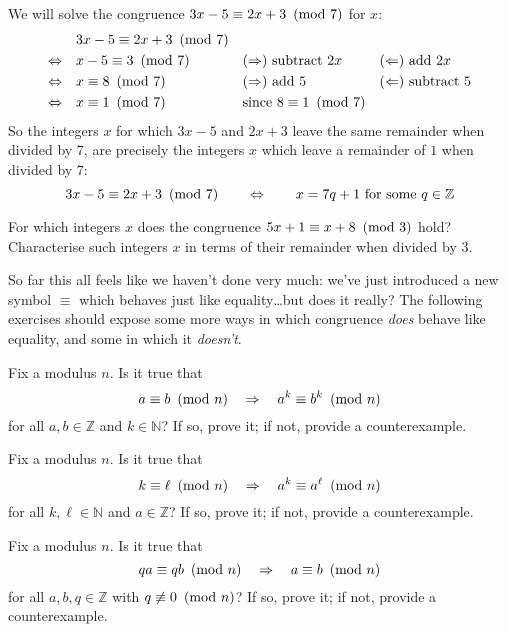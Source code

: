 \begin{example}
We will solve the congruence $3x-5 \equiv 2x+3 ~\left(\text{mod}~7\right)$ for $x$:
\begin{align*}
& 3x-5 \equiv 2x+3 ~\left(\text{mod}~7\right) && && \\
\Leftrightarrow\quad & x-5 \equiv 3 ~\left(\text{mod}~7\right) && \text{$(\Rightarrow)$ subtract $2x$} && \text{$(\Leftarrow)$ add $2x$} \\
\Leftrightarrow\quad & x \equiv 8 ~\left(\text{mod}~7\right) && \text{($\Rightarrow$) add $5$} && \text{($\Leftarrow$) subtract $5$} \\
\Leftrightarrow\quad & x \equiv 1 ~\left(\text{mod}~7\right) && \text{since $8 \equiv 1 ~\left(\text{mod}~7\right)$} &&
\end{align*}
So the integers $x$ for which $3x-5$ and $2x+3$ leave the same remainder when divided by $7$, are precisely the integers $x$ which leave a remainder of $1$ when divided by $7$:
\[ 3x-5 \equiv 2x+3 ~\left(\text{mod}~7\right) \qquad \Leftrightarrow \qquad x = 7q+1 \text{ for some } q \in \mathbb{Z} \]
\end{example}

\begin{exercise}
For which integers $x$ does the congruence $5x+1 \equiv x+8 ~\left(\text{mod}~3\right)$ hold? Characterise such integers $x$ in terms of their remainder when divided by $3$.
\end{exercise}

So far this all feels like we haven't done very much: we've just introduced a new symbol $\equiv$ which behaves just like equality\dots but does it really? The following exercises should expose some more ways in which congruence \textit{does} behave like equality, and some in which it \textit{doesn't}.

\begin{exercise}
Fix a modulus $n$. Is it true that
\[ a \equiv b ~\left(\text{mod}~n\right) \quad \Rightarrow \quad a^k \equiv b^k ~\left(\text{mod}~n\right) \] for all $a,b \in \mathbb{Z}$ and $k \in \mathbb{N}$? If so, prove it; if not, provide a counterexample.
\end{exercise}

\begin{exercise}
Fix a modulus $n$. Is it true that
\[ k \equiv \ell ~\left(\text{mod}~n\right) \quad \Rightarrow \quad a^k \equiv a^{\ell} ~\left(\text{mod}~n\right) \]
for all $k,\ell \in \mathbb{N}$ and $a \in \mathbb{Z}$? If so, prove it; if not, provide a counterexample.
\end{exercise}

\begin{exercise}
Fix a modulus $n$. Is it true that
\[ qa \equiv qb ~\left(\text{mod}~n\right) \quad \Rightarrow \quad a \equiv b ~\left(\text{mod}~n\right) \]
for all $a,b,q \in \mathbb{Z}$ with $q \not \equiv 0 ~\left(\text{mod}~n\right)$? If so, prove it; if not, provide a counterexample.
\end{exercise}

